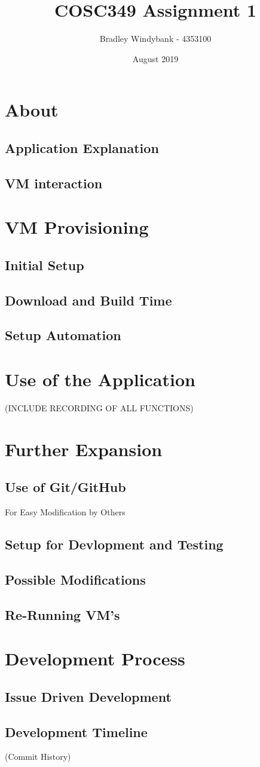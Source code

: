 \documentclass[12pt]{extarticle}
\title{COSC349 Assignment 1}
\author{Bradley Windybank - 4353100}
\date{August 2019}
\begin{document}
\maketitle

\section{About}
\subsection{Application Explanation}
\subsection{VM interaction}

\section{VM Provisioning}
\subsection{Initial Setup}
\subsection{Download and Build Time}
\subsection{Setup Automation}

\section{Use of the Application}
(INCLUDE RECORDING OF ALL FUNCTIONS)

\section{Further Expansion}
\subsection{Use of Git/GitHub}
For Easy Modification by Others
\subsection{Setup for Devlopment and Testing}
\subsection{Possible Modifications}
\subsection{Re-Running VM's}

\section{Development Process}
\subsection{Issue Driven Development}
\subsection{Development Timeline}
(Commit History)
\end{document}
